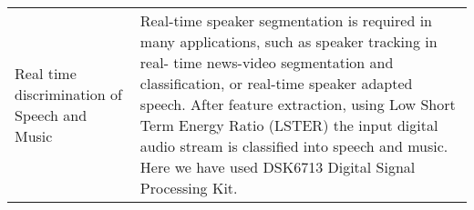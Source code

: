 \documentclass[8pt]{article}
\renewcommand{\section}[2]%
        {\pagebreak[2]\vspace{0.7\baselineskip}%
         \phantomsection\addcontentsline{toc}{section}{#1}%
         \hspace{0in}%
         \marginpar{
         \raggedright \scshape #1}#2}
\begin{document}
\begin{tabular}[t]{@{}>{\raggedright\arraybackslash}p{\textwidth-\rcollength-150pt}p{\rcollength+150pt}}
Real time discrimination of Speech and Music & Real-time speaker segmentation is required in many applications, such as speaker tracking in real- time news-video segmentation and classification, or real-time speaker adapted speech. After feature extraction, using Low Short Term Energy Ratio (LSTER) the input digital audio stream is classified into speech and music. Here we have used DSK6713 Digital Signal Processing Kit.\\
\end{tabular}


\end{document}
